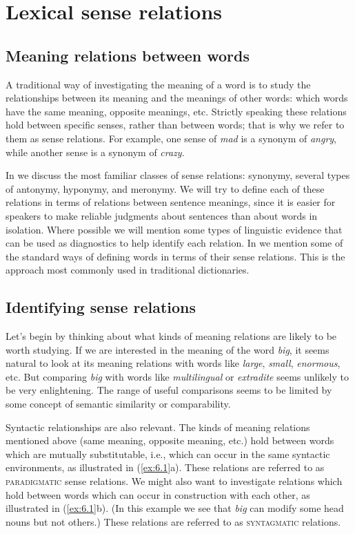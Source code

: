 \chapter{Lexical sense relations}\label{sec:6}

\section{Meaning relations between words}\label{sec:6.1}

A traditional way of investigating the meaning of a word is to study the relationships between its meaning and the meanings of other words: which words have the same meaning, opposite meanings, etc. Strictly speaking these relations hold between specific senses, rather than between words; that is why we refer to them as sense relations. For example, one sense of \textit{mad} is a synonym of \textit{angry}, while another sense is a synonym of \textit{crazy}.



In  we discuss the most familiar classes of sense relations: synonymy, several types of antonymy, hyponymy, and meronymy. We will try to define each of these relations in terms of relations between sentence meanings, since it is easier for speakers to make reliable judgments about sentences than about words in isolation. Where possible we will mention some types of linguistic evidence that can be used as diagnostics to help identify each relation. In  we mention some of the standard ways of defining words in terms of their sense relations. This is the approach most commonly used in traditional dictionaries.


\section{Identifying sense relations}\label{sec:6.2}

Let’s begin by thinking about what kinds of meaning relations are likely to be worth studying. If we are interested in the meaning of the word \textit{big}, it seems natural to look at its meaning relations with words like \textit{large}, \textit{small}, \textit{enormous}, etc. But comparing \textit{big} with words like \textit{multilingual} or \textit{extradite} seems unlikely to be very enlightening. The range of useful comparisons seems to be limited by some concept of semantic similarity or comparability.



Syntactic relationships are also relevant. The kinds of meaning relations mentioned above (same meaning, opposite meaning, etc.) hold between words which are mutually substitutable, i.e., which can occur in the same syntactic environments, as illustrated in (\ref{ex:6.1}a). These relations are referred to as \textsc{paradigmatic} sense relations. We might also want to investigate relations which hold between words which can occur in construction with each other, as illustrated in (\ref{ex:6.1}b). (In this example we see that \textit{big} can modify some head nouns but not others.) These relations are referred to as \textsc{syntagmatic} relations.



